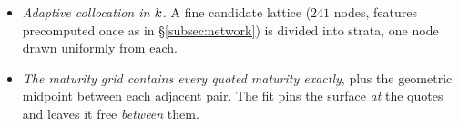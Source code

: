\begin{itemize}
    \item[i)] \emph{Adaptive collocation in $k$.} A fine candidate lattice ($241$ nodes, features
    precomputed once as in \S\ref{subsec:network}) is divided into strata, one node drawn uniformly
    from each. 
    


    \item[ii)] \emph{The maturity grid contains every quoted maturity exactly}, plus the geometric
    midpoint between each adjacent pair. The fit pins the surface \emph{at} the quotes and leaves it
    free \emph{between} them.
\end{itemize}

